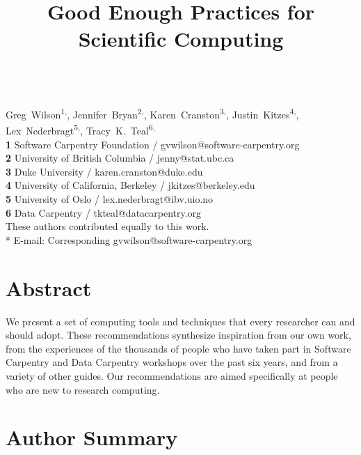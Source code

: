 \documentclass[10pt,letterpaper]{article}
\date{}
\begin{document}
\vspace*{0.2in}

\begin{flushleft}
{\Large
\textbf{}
}
\newline
\\
{Greg~Wilson}\textsuperscript{1,\ddag *},
{Jennifer~Bryan}\textsuperscript{2,\ddag},
{Karen~Cranston}\textsuperscript{3,\ddag},
{Justin~Kitzes}\textsuperscript{4,\ddag},
{Lex~Nederbragt}\textsuperscript{5,\ddag},
{Tracy~K.~Teal}\textsuperscript{6,\ddag}
\\
\textbf{1} Software Carpentry Foundation / gvwilson@software-carpentry.org
\\
\textbf{2} University of British Columbia / jenny@stat.ubc.ca
\\
\textbf{3} Duke University / karen.cranston@duke.edu
\\
\textbf{4} University of California, Berkeley / jkitzes@berkeley.edu
\\
\textbf{5} University of Oslo / lex.nederbragt@ibv.uio.no
\\
\textbf{6} Data Carpentry / tkteal@datacarpentry.org
\\
\bigskip
{\ddag} These authors contributed equally to this work.
\\
* E-mail: Corresponding gvwilson@software-carpentry.org

\end{flushleft}

\title{Good Enough Practices for Scientific Computing}

\section*{Abstract}

We present a set of computing tools and techniques that every
researcher can and should adopt.  These recommendations synthesize
inspiration from our own work, from the experiences of the thousands
of people who have taken part in Software Carpentry and Data Carpentry
workshops over the past six years, and from a variety of other guides.
Our recommendations are aimed specifically
at people who are new to research computing.

\section*{Author Summary}
\end{document}
